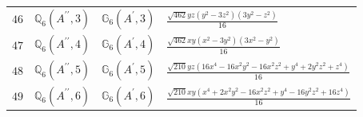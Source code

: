 \documentclass[fleqn,8pt,landscape]{jsarticle}
\begin{document}
\begin{table}[ht!]
\begin{center}
\begin{tabular}{cccl}
$ 46 $ & $ \mathbb{Q}_{6}(A^{\prime\prime},3) $ & $ \mathbb{G}_{6}(A^{\prime},3) $ & $ \frac{\sqrt{462} y z \left(y^{2} - 3 z^{2}\right) \left(3 y^{2} - z^{2}\right)}{16} $ \\
$ 47 $ & $ \mathbb{Q}_{6}(A^{\prime\prime},4) $ & $ \mathbb{G}_{6}(A^{\prime},4) $ & $ \frac{\sqrt{462} x y \left(x^{2} - 3 y^{2}\right) \left(3 x^{2} - y^{2}\right)}{16} $ \\
$ 48 $ & $ \mathbb{Q}_{6}(A^{\prime\prime},5) $ & $ \mathbb{G}_{6}(A^{\prime},5) $ & $ \frac{\sqrt{210} y z \left(16 x^{4} - 16 x^{2} y^{2} - 16 x^{2} z^{2} + y^{4} + 2 y^{2} z^{2} + z^{4}\right)}{16} $ \\
$ 49 $ & $ \mathbb{Q}_{6}(A^{\prime\prime},6) $ & $ \mathbb{G}_{6}(A^{\prime},6) $ & $ \frac{\sqrt{210} x y \left(x^{4} + 2 x^{2} y^{2} - 16 x^{2} z^{2} + y^{4} - 16 y^{2} z^{2} + 16 z^{4}\right)}{16} $ \\
 \hline \hline
\end{tabular}
\end{center}
\end{table}
\end{document}
